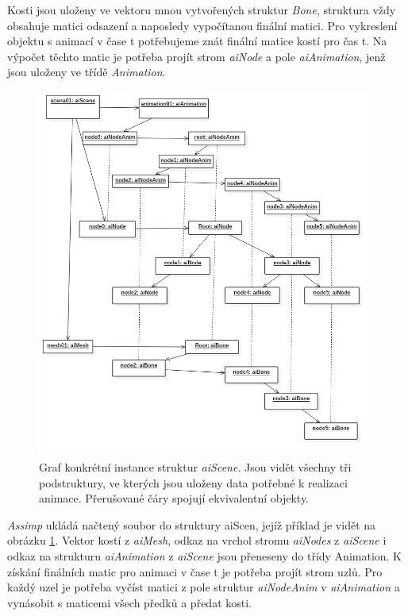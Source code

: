 Kosti jsou uloženy ve vektoru mnou vytvořených struktur \emph{Bone}, struktura vždy obsahuje matici odsazení a naposledy vypočítanou finální matici. Pro vykreslení objektu s animací v čase t potřebujeme znát finální matice kostí pro čas t. Na výpočet těchto matic je potřeba projít strom \emph{aiNode} a pole \emph{aiAnimation}, jenž jsou uloženy ve třídě \emph{Animation}.
    \begin{figure}
	\begin{center}
		\includegraphics[scale = 0.5]{obrazky-figures/aiATree}
		\caption{Graf konkrétní instance struktur \emph{aiScene}. Jsou vidět všechny tři podstruktury, ve kterých jsou uloženy data potřebné k realizaci animace. Přerušované čáry spojují ekvivalentní objekty.}\label{aiAtree}
\end{center}\end{figure}

\emph{Assimp} ukládá načtený soubor do struktury aiScen, jejíž příklad je vidět na obrázku \ref{aiAtree}. Vektor kostí z \emph{aiMesh}, odkaz na vrchol stromu \emph{aiNodes} z \emph{aiScene} i odkaz na strukturu \emph{aiAnimation} z \emph{aiScene} jsou přeneseny do třídy Animation. K získání finálních matic pro animaci v čase t je potřeba projít strom uzlů. Pro každý uzel je potřeba vyčíst matici z pole struktur \emph{aiNodeAnim} v \emph{aiAnimation} a vynásobit s maticemi všech předků a předat kosti.
  
